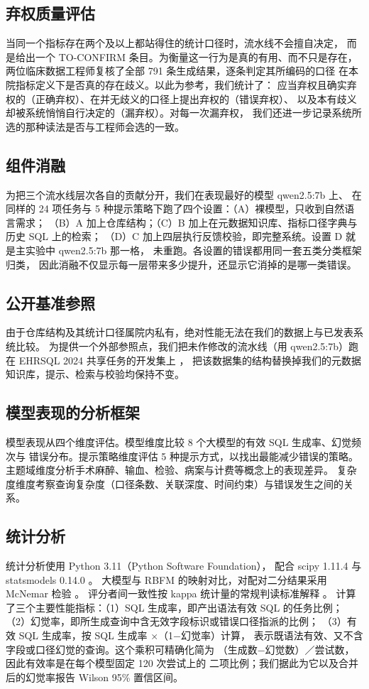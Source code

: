 \documentclass[11pt,a4paper]{article}
\begin{document}
\subsection{弃权质量评估}
当同一个指标存在两个及以上都站得住的统计口径时，流水线不会擅自决定，
而是给出一个 TO-CONFIRM 条目。为衡量这一行为是真的有用、而不只是存在，
两位临床数据工程师复核了全部 791 条生成结果，逐条判定其所编码的口径
在本院指标定义下是否真的存在歧义。以此为参考，我们统计了：
应当弃权且确实弃权的（正确弃权）、在并无歧义的口径上提出弃权的（错误弃权）、
以及本有歧义却被系统悄悄自行决定的（漏弃权）。对每一次漏弃权，
我们还进一步记录系统所选的那种读法是否与工程师会选的一致。

\subsection{组件消融}
为把三个流水线层次各自的贡献分开，我们在表现最好的模型 qwen2.5:7b 上、
在同样的 24 项任务与 5 种提示策略下跑了四个设置：（A）裸模型，只收到自然语言需求；
（B）A 加上仓库结构；（C）B 加上在元数据知识库、指标口径字典与历史 SQL 上的检索；
（D）C 加上四层执行反馈校验，即完整系统。设置 D 就是主实验中 qwen2.5:7b 那一格，
未重跑。各设置的错误都用同一套五类分类框架归类，
因此消融不仅显示每一层带来多少提升，还显示它消掉的是哪一类错误。

\subsection{公开基准参照}
由于仓库结构及其统计口径属院内私有，绝对性能无法在我们的数据上与已发表系统比较。
为提供一个外部参照点，我们把未作修改的流水线（用 qwen2.5:7b）跑在
EHRSQL 2024 共享任务的开发集上 \cite{ehrsql2024}，
把该数据集的结构替换掉我们的元数据知识库，提示、检索与校验均保持不变。

\subsection{模型表现的分析框架}
模型表现从四个维度评估。模型维度比较 8 个大模型的有效 SQL 生成率、幻觉频次与
错误分布。提示策略维度评估 5 种提示方式，以找出最能减少错误的策略。
主题域维度分析手术麻醉、输血、检验、病案与计费等概念上的表现差异。
复杂度维度考察查询复杂度（口径条数、关联深度、时间约束）与错误发生之间的关系。

\subsection{统计分析}
统计分析使用 Python 3.11（Python Software Foundation），
配合 scipy 1.11.4 \cite{scipy2020} 与 statsmodels 0.14.0 \cite{statsmodels2010}。
大模型与 RBFM 的映射对比，对配对二分结果采用 McNemar 检验 \cite{mcnemar1947}。
评分者间一致性按 kappa 统计量的常规判读标准解释 \cite{landis1977}。
计算了三个主要性能指标：（1）SQL 生成率，即产出语法有效 SQL 的任务比例；
（2）幻觉率，即所生成查询中含无效字段标识或错误口径指派的比例；
（3）有效 SQL 生成率，按 SQL 生成率 $\times$（1$-$幻觉率）计算，
表示既语法有效、又不含字段或口径幻觉的查询。这个乘积可精确化简为
（生成数$-$幻觉数）／尝试数，因此有效率是在每个模型固定 120 次尝试上的
二项比例；我们据此为它以及合并后的幻觉率报告 Wilson 95\% 置信区间。
\end{document}
